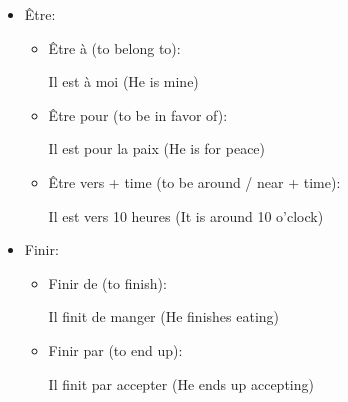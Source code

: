 \documentclass{book}
\begin{document}
\begin{itemize}
\begin{itemize}
                    \item Donner sur (to overlook / to open on):
                        \begin{center}
                            La fenêtre donne sur la rue (The window overlooks the street)
                        \end{center}
                \end{itemize}

            \item Être:
                \begin{itemize}
                    \item Être à (to belong to):
                        \begin{center}
                            Il est à moi (He is mine)
                        \end{center}
                    
                    \item Être pour (to be in favor of):
                        \begin{center}
                            Il est pour la paix (He is for peace)
                        \end{center}
                    
                    \item Être vers + time (to be around / near + time):
                        \begin{center}
                            Il est vers 10 heures (It is around 10 o'clock)
                        \end{center}
                \end{itemize}

            \item Finir:
                \begin{itemize}
                    \item Finir de (to finish):
                        \begin{center}
                            Il finit de manger (He finishes eating)
                        \end{center}
                        
                    \item Finir par (to end up):
                        \begin{center}
                            Il finit par accepter (He ends up accepting)
                        \end{center}
                \end{itemize}


\end{itemize}
\end{document}
